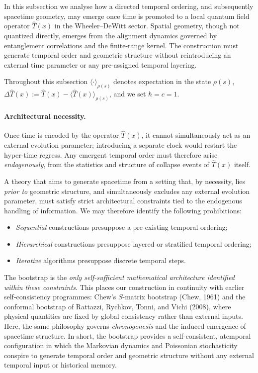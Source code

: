 \documentclass[12pt,a4paper]{article}
\numberwithin{equation}{section}
\begin{document}
\vspace{0.3cm}
In this subsection we analyse how a directed temporal ordering, and subsequently spacetime geometry, may emerge once time is promoted to a local quantum field operator $\hat T(x)$ in the Wheeler--DeWitt sector. Spatial geometry, though not quantized directly, emerges from the alignment dynamics governed by entanglement correlations and the finite-range kernel. The construction must generate temporal order and geometric structure without reintroducing an external time parameter or any pre-assigned temporal layering.

\vspace{0.3cm}

\noindent Throughout this subsection $\langle\cdot\rangle_{\rho(s)}$ denotes expectation in the state $\rho(s)$, $\Delta\hat T(x):=\hat T(x)-\langle\hat T(x)\rangle_{\rho(s)}$, and we set $\hbar=c=1$.

\paragraph{Architectural necessity.}
Once time is encoded by the operator $\hat T(x)$, it cannot simultaneously act as an external evolution parameter; introducing a separate clock would restart the hyper-time regress. Any emergent temporal order must therefore arise \emph{endogenously}, from the statistics and structure of collapse events of $\hat T(x)$ itself. 

A theory that aims to generate spacetime from a setting that, by necessity, lies \emph{prior to} geometric structure, and simultaneously excludes any external evolution parameter, must satisfy strict architectural constraints tied to the endogenous handling of information. We may therefore identify the following prohibitions:
\begin{itemize}[leftmargin=1.5em,itemsep=0.1em]
\item \emph{Sequential} constructions presuppose a pre-existing temporal ordering;
\item \emph{Hierarchical} constructions presuppose layered or stratified temporal ordering;
\item \emph{Iterative} algorithms presuppose discrete temporal steps.
\end{itemize}
The bootstrap is the \emph{only self-sufficient mathematical architecture identified within these constraints}. This places our construction in continuity with earlier self-consistency programmes: Chew’s $S$-matrix bootstrap (Chew, 1961) and the conformal bootstrap of Rattazzi, Rychkov, Tonni, and Vichi (2008), where physical quantities are fixed by global consistency rather than external inputs. Here, the same philosophy governs \emph{chronogenesis} and the induced emergence of spacetime structure. In short, the bootstrap provides a self-consistent, atemporal configuration in which the Markovian dynamics and Poissonian stochasticity conspire to generate temporal order and geometric structure without any external temporal input or historical memory.
\end{document}
